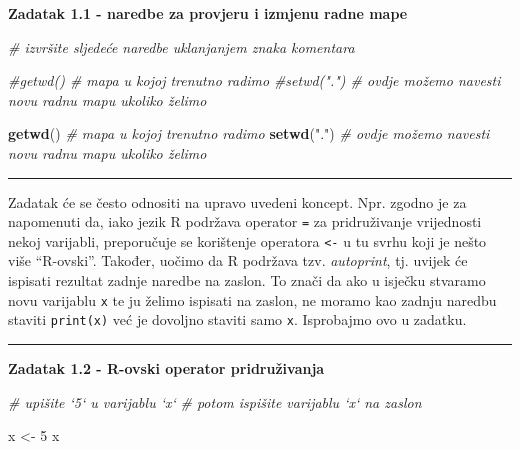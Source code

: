 \documentclass[]{book}
\newenvironment{Shaded}{\begin{snugshade}}{\end{snugshade}}
\newcommand{\KeywordTok}[1]{\textcolor[rgb]{0.13,0.29,0.53}{\textbf{#1}}}
\newcommand{\DecValTok}[1]{\textcolor[rgb]{0.00,0.00,0.81}{#1}}
\newcommand{\StringTok}[1]{\textcolor[rgb]{0.31,0.60,0.02}{#1}}
\newcommand{\CommentTok}[1]{\textcolor[rgb]{0.56,0.35,0.01}{\textit{#1}}}
\newcommand{\NormalTok}[1]{#1}
\theoremstyle{definition}
\theoremstyle{definition}
\theoremstyle{definition}
\theoremstyle{remark}
\begin{document}
\textbf{Zadatak 1.1 - naredbe za provjeru i izmjenu radne mape}

\begin{Shaded}
\begin{Highlighting}[]
\CommentTok{# izvršite sljedeće naredbe uklanjanjem znaka komentara}

\CommentTok{#getwd()     # mapa u kojoj trenutno radimo}
\CommentTok{#setwd(".")  # ovdje možemo navesti novu radnu mapu ukoliko želimo}
\end{Highlighting}
\end{Shaded}

\begin{Shaded}
\begin{Highlighting}[]
\KeywordTok{getwd}\NormalTok{()     }\CommentTok{# mapa u kojoj trenutno radimo}
\KeywordTok{setwd}\NormalTok{(}\StringTok{"."}\NormalTok{)  }\CommentTok{# ovdje možemo navesti novu radnu mapu ukoliko želimo}
\end{Highlighting}
\end{Shaded}

\begin{center}\rule{0.5\linewidth}{\linethickness}\end{center}

Zadatak će se često odnositi na upravo uvedeni koncept. Npr. zgodno je
za napomenuti da, iako jezik R podržava operator \texttt{=} za
pridruživanje vrijednosti nekoj varijabli, preporučuje se korištenje
operatora \texttt{\textless{}-} u tu svrhu koji je nešto više
``R-ovski''. Također, uočimo da R podržava tzv. \emph{autoprint}, tj.
uvijek će ispisati rezultat zadnje naredbe na zaslon. To znači da ako u
isječku stvaramo novu varijablu \texttt{x} te ju želimo ispisati na
zaslon, ne moramo kao zadnju naredbu staviti \texttt{print(x)} već je
dovoljno staviti samo \texttt{x}. Isprobajmo ovo u zadatku.

\begin{center}\rule{0.5\linewidth}{\linethickness}\end{center}

\textbf{Zadatak 1.2 - R-ovski operator pridruživanja}

\begin{Shaded}
\begin{Highlighting}[]
\CommentTok{# upišite `5` u varijablu `x`}
\CommentTok{# potom ispišite varijablu `x` na zaslon}
\end{Highlighting}
\end{Shaded}

\begin{Shaded}
\begin{Highlighting}[]
\NormalTok{x <-}\StringTok{ }\DecValTok{5}
\NormalTok{x}
\end{Highlighting}
\end{Shaded}
\end{document}
